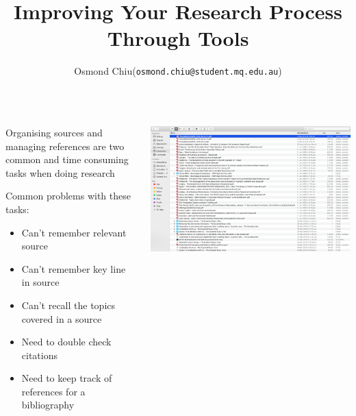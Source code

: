 \documentclass[unknownkeysallowed,usepdftitle=false, parskip=full, aspectratio=169]{beamer}
\title{Improving Your Research Process Through Tools}
\author{Osmond Chiu\inst (\texttt{osmond.chiu@student.mq.edu.au})}
\institute{Macquarie University}
\newcommand{\secvariable}{nothing}
\newcommand{\mysection}[1]{\renewcommand{\secvariable}{#1}
}
\begin{document}
\mysection{abstract}
\begin{frame}\label{\secvariable}



\parbox{\linewidth}{

\begin{columns}[t]
    \begin{column}[c]{0.5\textwidth}

Organising sources and managing references are two common and time consuming tasks when doing research

 \vspace{12pt}

Common problems with these tasks:
\begin{itemize}
\item Can't remember relevant source
\item Can't remember key line in source
\item Can't recall the topics covered in a source
\item Need to double check citations
\item Need to keep track of references for a bibliography
\end{itemize}

 \end{column}
    \begin{column}[c]{0.5\textwidth}
\includegraphics[width=1\textwidth,height=0.5\textheight,keepaspectratio]{pdf.png}\\

 \vspace{12pt}


 
   \end{column}
  \end{columns}

}

   
\end{frame}
\end{document}
